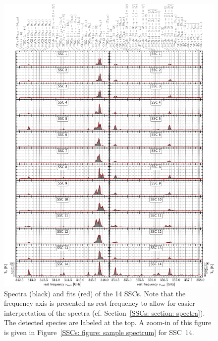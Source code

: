 \begin{figure}
    \centering
    \includegraphics[width=\textwidth]{images/chapters/papers/SSCs/SSCs_all_spectra}
    \caption[Spectra on the 14 SSCs at $\sim 350$\,GHz]{Spectra (black) and \xclass fits (red) of the 14 SSCs. Note that the frequency axis is presented as rest frequency to allow for easier interpretation of the spectra (cf. Section~\ref{SSCs: section: spectra}). The detected species are labeled at the top. A zoom-in of this figure is given in Figure~\ref{SSCs: figure: sample spectrum} for SSC~14.}
    \label{SSCs: figure: fitted bands}
\end{figure}


